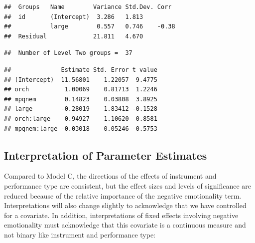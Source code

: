 \documentclass[
]{krantz}
\begin{document}
\begin{verbatim}
##  Groups   Name        Variance Std.Dev. Corr 
##  id       (Intercept)  3.286   1.813         
##           large        0.557   0.746    -0.38
##  Residual             21.811   4.670
\end{verbatim}

\begin{verbatim}
##  Number of Level Two groups =  37
\end{verbatim}

\begin{verbatim}
##              Estimate Std. Error t value
## (Intercept)  11.56801    1.22057  9.4775
## orch          1.00069    0.81713  1.2246
## mpqnem        0.14823    0.03808  3.8925
## large        -0.28019    1.83412 -0.1528
## orch:large   -0.94927    1.10620 -0.8581
## mpqnem:large -0.03018    0.05246 -0.5753
\end{verbatim}

\subsection{Interpretation of Parameter Estimates}\label{interp:modeld}

Compared to Model C, the directions of the effects of instrument and performance type are consistent, but the effect sizes and levels of significance are reduced because of the relative importance of the negative emotionality term. Interpretations will also change slightly to acknowledge that we have controlled for a covariate. In addition, interpretations of fixed effects involving negative emotionality must acknowledge that this covariate is a continuous measure and not binary like instrument and performance type:
\end{document}
